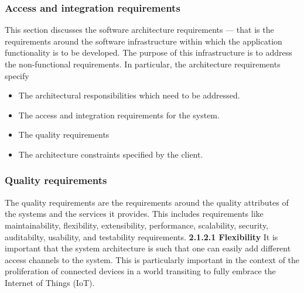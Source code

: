 \documentclass[11pt]{article}
\begin{document}
	\subsubsection{Access and integration requirements}
	This section discusses the software architecture requirements — that is the requirements around the
	software infrastructure within which the application functionality is to be developed. The purpose of this infrastructure is to address the non-functional requirements. In particular, the architecture
	requirements specify
	\begin{itemize}
		\item The architectural responsibilities which need to be addressed.
		\item The access and integration requirements for the system.
		\item The quality requirements
		\item The architecture constraints specified by the client.
	\end{itemize}

	\subsubsection{Quality requirements}
	The quality requirements are the requirements around the quality attributes of the systems and
	the services it provides. This includes requirements like maintainability, flexibility, extensibility,
	performance, scalability, security, auditabilty, usability, and testability requirements.
	\newline
	\newline
	\textbf{2.1.2.1 Flexibility}
	\newline
	\newline
	It is important that the system architecture is such that one can easily
	add different access channels to the system. This is particularly important in the context of the
	proliferation of connected devices in a world transiting to fully embrace the Internet of Things
	(IoT).	
	
\end{document}
